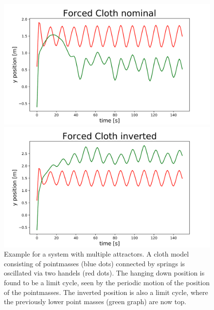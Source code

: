 \begin{figure}[h!]
        
        \begin{minipage}{0.4\textwidth}
            \centering
            \includegraphics[width=\textwidth]{figures/forced_cloth_nominal_graph.png} %
        \end{minipage}
        \begin{minipage}{0.4\textwidth}
            \centering
            \includegraphics[width=\textwidth]{figures/forced_cloth_inverted_graph.png} %
        \end{minipage}

    \caption[Example for systems with multiple attractors: Inverted Cloth]{Example for a system with multiple attractors. A cloth model consisting of pointmasses (blue dots) connected by springs is oscillated via two handels (red dots). The hanging down position is found to be a limit cycle, seen by the periodic motion of the position of the pointmasses. The inverted position is also a limit cycle, where the previously lower point masses (green graph) are now top.}
    \label{fig:invcloth}
\end{figure}

